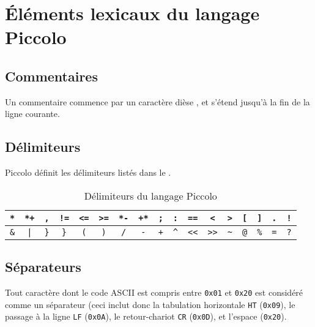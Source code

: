 
\cleardoublepage

\chapter{Éléments lexicaux du langage Piccolo}

\thispagestyle{empty}


\section{Commentaires}

Un commentaire commence par un caractère dièse \piccolo{\#}, et s’étend jusqu’à la fin de la ligne courante.

\section{Délimiteurs}

Piccolo définit les délimiteurs listés dans le .

\begin{table}[ht]
  \centering
  \begin{tabular}{|c|c|c|c|c|c|c|c|c|c|c|c|c|c|c|c|c|}
    \hline
    \texttt{*}  & \texttt{*+} & \texttt{,}  & \texttt{!=} & \texttt{<=} & \texttt{>=} & \texttt{*-} & \texttt{+*} & \texttt{;} & \texttt{:} & \texttt{==} & \texttt{<} & \texttt{>} & \texttt{[} & \texttt{]} & \texttt{.} & \texttt{!} \\
    \hline
    \texttt{\&} & \texttt{|}  & \texttt{\}} & \texttt{\}} & \texttt{(}  & \texttt{)}  & \texttt{/}  & \texttt{-} & \texttt{+} & \texttt{\textasciicircum} & \texttt{<{}<} & \texttt{>{}>} & \texttt{\textasciitilde} & \texttt{@} & \texttt{\%} & \texttt{=} & \texttt{?} \\
    \hline
  \end{tabular}
  \caption{Délimiteurs du langage Piccolo}
\end{table}

\section{Séparateurs}

Tout caractère dont le code ASCII est compris entre \texttt{0x01} et \texttt{0x20} est considéré comme un séparateur (ceci inclut donc la tabulation horizontale \texttt{HT} (\texttt{0x09}), le passage à la ligne \texttt{LF} (\texttt{0x0A}), le retour-chariot \texttt{CR} (\texttt{0x0D}), et l’espace (\texttt{0x20}).

